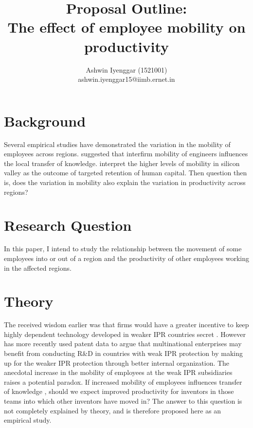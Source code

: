 \documentclass[12pt]{article}
\begin{document}
\title{Proposal Outline:\\The effect of employee mobility on  productivity}
\author{Ashwin Iyenggar  (1521001) \\ ashwin.iyenggar15@iimb.ernet.in} 


\maketitle
\thispagestyle{empty}
\section{Background}
Several empirical studies have demonstrated the variation in the mobility of employees across regions. \cite{Almeida1999} suggested that interfirm mobility of engineers influences the local transfer of knowledge.  \cite{Ge2016} interpret the higher levels of mobility in silicon valley as the outcome of targeted retention of human capital. Then question then is, does the variation in mobility also explain the variation in productivity across regions?

\section{Research Question}
In this paper, I intend to study the relationship between the movement of some employees into or out of a region and the productivity of other employees working in the affected regions. 

\section{Theory}
The received wisdom earlier was that firms would have a greater incentive to keep  highly dependent technology developed in weaker IPR countries secret \citep{Cohen2000}. However  \cite{Zhao2006} has more recently used patent data to argue  that multinational enterprises may benefit from conducting R\&D in countries with weak IPR protection by  making up for the weaker IPR protection through better internal organization. The anecdotal increase in the mobility of employees at the weak IPR subsidiaries raises a potential paradox. If increased mobility of employees influences transfer of knowledge \citep{Almeida1999}, should we expect improved productivity for inventors in those teams into which other inventors have moved in? The answer to this question is not completely explained by theory, and is therefore proposed here as an empirical study.
\end{document}
